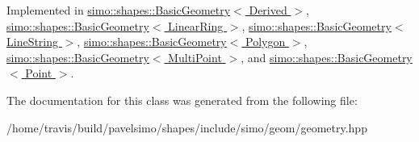 Implemented in \hyperlink{classsimo_1_1shapes_1_1_basic_geometry_a94dd1ee38d7b46ce92d1f547293fedce}{simo\-::shapes\-::\-Basic\-Geometry$<$ Derived $>$}, \hyperlink{classsimo_1_1shapes_1_1_basic_geometry_a94dd1ee38d7b46ce92d1f547293fedce}{simo\-::shapes\-::\-Basic\-Geometry$<$ Linear\-Ring $>$}, \hyperlink{classsimo_1_1shapes_1_1_basic_geometry_a94dd1ee38d7b46ce92d1f547293fedce}{simo\-::shapes\-::\-Basic\-Geometry$<$ Line\-String $>$}, \hyperlink{classsimo_1_1shapes_1_1_basic_geometry_a94dd1ee38d7b46ce92d1f547293fedce}{simo\-::shapes\-::\-Basic\-Geometry$<$ Polygon $>$}, \hyperlink{classsimo_1_1shapes_1_1_basic_geometry_a94dd1ee38d7b46ce92d1f547293fedce}{simo\-::shapes\-::\-Basic\-Geometry$<$ Multi\-Point $>$}, and \hyperlink{classsimo_1_1shapes_1_1_basic_geometry_a94dd1ee38d7b46ce92d1f547293fedce}{simo\-::shapes\-::\-Basic\-Geometry$<$ Point $>$}.



The documentation for this class was generated from the following file\-:\begin{DoxyCompactItemize}
\item 
/home/travis/build/pavelsimo/shapes/include/simo/geom/geometry.\-hpp\end{DoxyCompactItemize}
